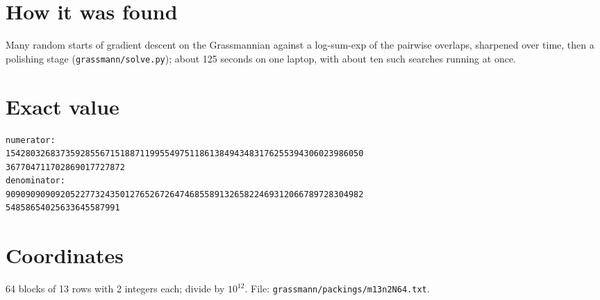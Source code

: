 \documentclass[11pt,a4paper]{article}
\begin{document}
\section{How it was found}
Many random starts of gradient descent on the Grassmannian against a log-sum-exp of the pairwise overlaps, sharpened over time, then a polishing stage (\texttt{grassmann/solve.py}); about 125 seconds on one laptop, with about ten such searches running at once.


\appendix
\section{Exact value}
{\small
\begin{verbatim}
numerator:
154280326837359285567151887119955497511861384943483176255394306023986050
367704711702869017727872
denominator:
909090909092052277324350127652672647468558913265822469312066789728304982
54858654025633645587991
\end{verbatim}}

\section{Coordinates}
64 blocks of 13 rows with 2 integers each; divide by $10^{12}$. File: \texttt{grassmann/packings/m13n2N64.txt}.
{\tiny
\begin{multicols}{4}
\end{multicols}}
\end{document}

